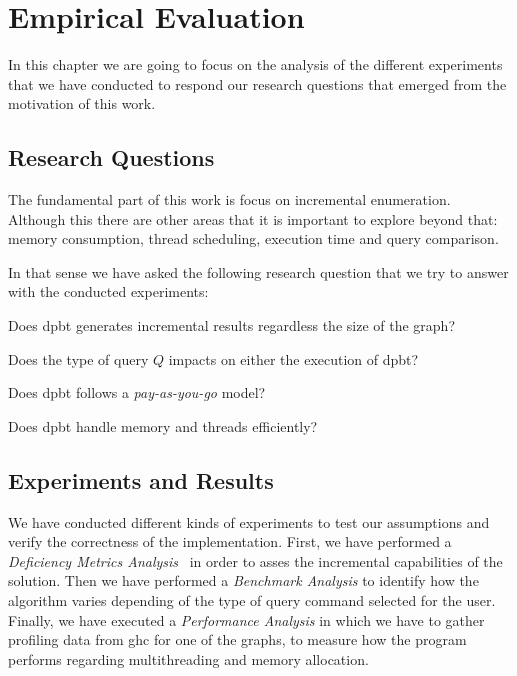 \chapter{Empirical Evaluation}\label{experiments}
In this chapter we are going to focus on the analysis of the different experiments that we have conducted
to respond our research questions that emerged from the motivation of this work. 

\section{Research Questions}
The fundamental part of this work is focus on incremental enumeration. Although this there are other areas that 
it is important to explore beyond that: memory consumption, thread scheduling, execution time and query comparison.

In that sense we have asked the following research question that we try to answer with the conducted experiments:
\begin{inparaenum}[\bf {\bf RQ}1\upshape)]
\label{res:question}
    \item Does \acrshort{dpbt} generates incremental results regardless the size of the graph?
    \item Does the type of query $Q$ impacts on either the execution of \acrshort{dpbt}?
    \item Does \acrshort{dpbt} follows a \emph{pay-as-you-go} model?
    \item Does \acrshort{dpbt} handle memory and threads efficiently?
\end{inparaenum}
  
\section{Experiments and Results}

We have conducted different kinds of experiments to test our assumptions and verify the correctness of the implementation.
First, we have performed a \emph{Deficiency Metrics Analysis}~\cite{diefpaper} in order to asses the incremental capabilities of the solution. 
Then we have performed a \emph{Benchmark Analysis} to identify how the algorithm varies depending of the type of query command selected for the user.
Finally, we have executed a \textit{Performance Analysis} in which we have to gather profiling data from \acrfull{ghc} for one of the graphs, 
to measure how the program performs regarding multithreading and memory allocation.

